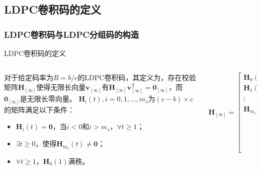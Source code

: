 \documentclass{beamer}
\begin{document}
\subsection{LDPC卷积码的定义}
\begin{frame}[shrink]
    \frametitle{LDPC卷积码与LDPC分组码的构造}
        \begin{block}{LDPC卷积码的定义}
        \begin{columns}
        \begin{column}{0.4\textwidth}
        \footnotesize
对于给定码率为$R=b/c$的LDPC卷积码，其定义为，存在校验矩阵$\mathbf{H}_{[\infty]}$使得无限长向量$\mathbf{v}_{[\infty]}$有$\mathbf{H}_{[\infty]}\mathbf{v}_{[\infty]}^\text{T} =\mathbf{0}_{[\infty]}$，而$\mathbf{0}_{[\infty]}$是无限长零向量。
$\mathbf{H}_i(t),i=0,1,\dots,m_s$为$(c-b)\times c$的矩阵满足以下条件：
\begin{itemize}
\item $\mathbf{H}_i(t)=\mathbf{0}$，当$i<0$和$i>m_s$，$\forall t \geq 1$；
\item $\exists t\geq 0$，使得$\mathbf{H}_{m_s}(t) \neq \mathbf{0}$；
\item $\forall t \geq 1$，$\mathbf{H}_0(1)$满秩。
\end{itemize}
\end{column}
\begin{column}{0.6\textwidth}
\footnotesize
\begin{equation*}
    \mathbf{H}_{[\infty]} = \left[
          \begin{array}{ccccc}
            \mathbf{H}_0(1) & & & & \\
            \mathbf{H}_1(1) & \mathbf{H}_0(2) & & & \\
            \vdots & \mathbf{H}_1(2) & \ddots & & \\
            \mathbf{H}_{m_s}(1) & \vdots & \ddots & \mathbf{H}_0(t) & \\
             & \mathbf{H}_{m_s}(2) & \ddots & \mathbf{H}_1(t) & \ddots\\
             & & \ddots & \vdots & \ddots \\
             & & & \mathbf{H}_{m_s}(t) & \ddots \\
             & & & & \ddots
          \end{array} \right]
\end{equation*}
\end{column}
\end{columns}
        \end{block}
\end{frame}
\end{document}
